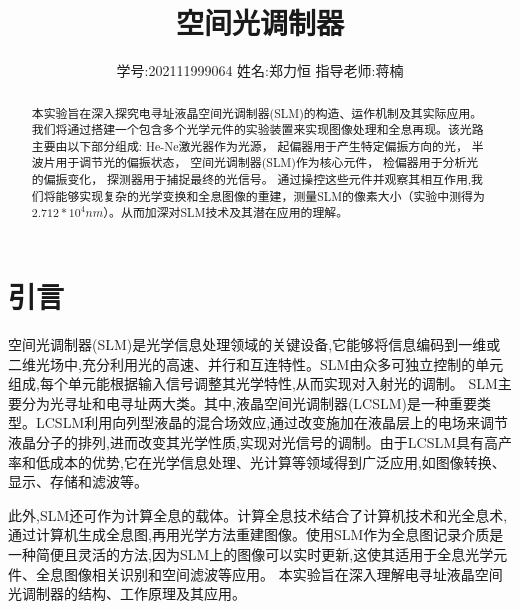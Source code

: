\documentclass[11pt,a4paper]{article}
\title{\vspace{-4cm}\Large 空间光调制器}  %
\author{\kaishu 学号:202111999064 \hspace{1.5cm} 姓名:郑力恒 \hspace{1.5cm} 指导老师:蒋楠}   %
\date{}
\begin{document}
\maketitle

\begin{abstract}
    本实验旨在深入探究电寻址液晶空间光调制器(SLM)的构造、运作机制及其实际应用。我们将通过搭建一个包含多个光学元件的实验装置来实现图像处理和全息再现。该光路主要由以下部分组成:
    He-Ne激光器作为光源，
    起偏器用于产生特定偏振方向的光，
    半波片用于调节光的偏振状态，
    空间光调制器(SLM)作为核心元件，
    检偏器用于分析光的偏振变化，
    探测器用于捕捉最终的光信号。
    通过操控这些元件并观察其相互作用,我们将能够实现复杂的光学变换和全息图像的重建，测量SLM的像素大小（实验中测得为$2.712*10^4nm$）。从而加深对SLM技术及其潜在应用的理解。
\end{abstract}

\section{引言}
空间光调制器(SLM)是光学信息处理领域的关键设备,它能够将信息编码到一维或二维光场中,充分利用光的高速、并行和互连特性。SLM由众多可独立控制的单元组成,每个单元能根据输入信号调整其光学特性,从而实现对入射光的调制。
SLM主要分为光寻址和电寻址两大类。其中,液晶空间光调制器(LCSLM)是一种重要类型。LCSLM利用向列型液晶的混合场效应,通过改变施加在液晶层上的电场来调节液晶分子的排列,进而改变其光学性质,实现对光信号的调制。由于LCSLM具有高产率和低成本的优势,它在光学信息处理、光计算等领域得到广泛应用,如图像转换、显示、存储和滤波等。

此外,SLM还可作为计算全息的载体。计算全息技术结合了计算机技术和光全息术,通过计算机生成全息图,再用光学方法重建图像。使用SLM作为全息图记录介质是一种简便且灵活的方法,因为SLM上的图像可以实时更新,这使其适用于全息光学元件、全息图像相关识别和空间滤波等应用。
本实验旨在深入理解电寻址液晶空间光调制器的结构、工作原理及其应用。
\end{document}
